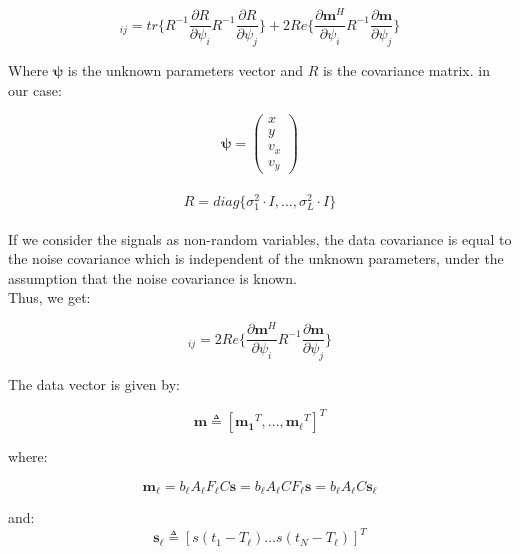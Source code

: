\documentclass[10pt,a4paper]{report}
\begin{document}
\begin{equation}
[J]_{ij}=tr\{ R^{-1}\frac{\partial R}{\partial \psi_{i}}R^{-1}\frac{\partial R}{\partial \psi_{j}}\}+2Re\{\frac{\partial \mathbf{m}^H}{\partial \psi_{i}}R^{-1}\frac{\partial \mathbf{m}}{\partial \psi_{j}}\}
\end{equation}

Where $\mathbf{\psi}$ is the unknown parameters vector and $R$ is the covariance matrix. in our case: 

\begin{equation*}
\mathbf{\psi} = \begin{pmatrix} x\\y\\v_x\\v_y\end{pmatrix}
\end{equation*}
\\
\begin{equation*}
R = diag \{\sigma_1^2 \cdot I,\dots,\sigma_L^2 \cdot I\}
\end{equation*}
\\

If we consider the signals as non-random variables, the data covariance is equal to the noise covariance which is independent of the unknown parameters, under the assumption that the noise covariance is known. \\
Thus, we get: 

\begin{equation}
[J]_{ij} =	2Re\{\frac{\partial \mathbf{m}^H}{\partial \psi_{i}}R^{-1}\frac{\partial \mathbf{m}}{\partial \psi_{j}}\}
\end{equation}

The data vector is given by:

\begin{equation}
\mathbf{m} \triangleq [\mathbf{m_1}^T,\dots ,\mathbf{m_\ell}^T]^T                                              
\end{equation}

where:

\begin{equation}
\mathbf{m_\ell}=b_\ell A_\ell F_\ell C \mathbf{s}=b_\ell A_\ell C F_\ell \mathbf{s} = b_\ell A_\ell C \mathbf{s_\ell}
\end{equation}


and:
\begin{equation}
\mathbf{s_\ell} \triangleq [s(t_1-T_\ell) \dots s(t_N-T_\ell)]^T                                                           
\end{equation}
\end{document}
